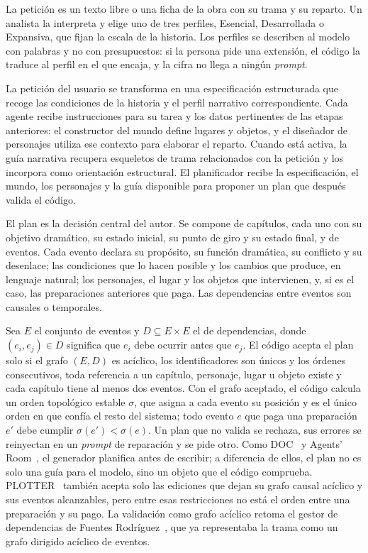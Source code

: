 La petición es un texto libre o una ficha de la obra con su trama y su reparto. Un analista la
interpreta y elige uno de tres perfiles, Esencial, Desarrollada o Expansiva, que fijan la escala de
la historia. Los perfiles se describen al modelo con palabras y no con presupuestos: si la persona
pide una extensión, el código la traduce al perfil en el que encaja, y la cifra no llega a ningún \textit{prompt}.

La petición del usuario se transforma en una especificación estructurada que recoge las condiciones
de la historia y el perfil narrativo correspondiente. Cada agente recibe instrucciones para su tarea
y los datos pertinentes de las etapas anteriores: el constructor del mundo define lugares y objetos,
y el diseñador de personajes utiliza ese contexto para elaborar el reparto. Cuando está activa, la
guía narrativa recupera esqueletos de trama relacionados con la petición y los incorpora como
orientación estructural. El planificador recibe la especificación, el mundo, los personajes y la guía
disponible para proponer un plan que después valida el código.

El plan es la decisión central del autor. Se compone de capítulos, cada uno con su objetivo
dramático, su estado inicial, su punto de giro y su estado final, y de eventos. Cada evento declara
su propósito, su función dramática, su conflicto y su desenlace; las condiciones que lo hacen
posible y los cambios que produce, en lenguaje natural; los personajes, el lugar y los objetos que
intervienen, y, si es el caso, las preparaciones anteriores que paga. Las dependencias entre
eventos son causales o temporales.

Sea $E$ el conjunto de eventos y $D \subseteq E \times E$ el de dependencias, donde $(e_i, e_j) \in
D$ significa que $e_i$ debe ocurrir antes que $e_j$. El código acepta el plan solo si el grafo
$(E, D)$ es acíclico, los identificadores son únicos y los órdenes consecutivos, toda referencia a
un capítulo, personaje, lugar u objeto existe y cada capítulo tiene al menos dos eventos. Con el
grafo aceptado, el código calcula un orden topológico estable $\sigma$, que asigna a cada evento su
posición y es el único orden en que confía el resto del sistema; todo evento $e$ que paga una
preparación $e'$ debe cumplir $\sigma(e') < \sigma(e)$. Un plan que no valida se rechaza, sus
errores se reinyectan en un \textit{prompt} de reparación y se pide otro. Como DOC~\cite{yang2023} y
Agents' Room~\cite{huot2025}, el generador planifica antes de escribir; a diferencia de ellos, el
plan no es solo una guía para el modelo, sino un objeto que el código comprueba. PLOTTER~\cite{gu2026}
también acepta solo las ediciones que dejan su grafo causal acíclico y sus eventos alcanzables, pero
entre esas restricciones no está el orden entre una preparación y su pago. La validación como
grafo acíclico retoma el gestor de dependencias de Fuentes Rodríguez~\cite{fuentes2025}, que ya
representaba la trama como un grafo dirigido acíclico de eventos.

